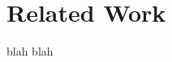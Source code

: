 \documentclass[../main/Self-Stabilization.tex]{subfiles}
\begin{document}
\section{Related Work}
blah blah
\end{document}
